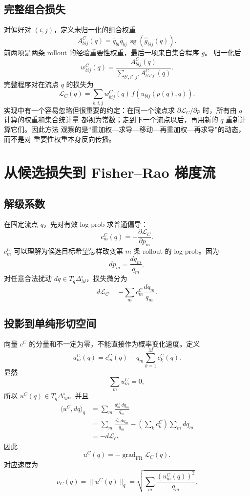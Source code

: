 \documentclass[UTF8,11pt]{ctexart}
\newcommand{\simplex}{\Delta_M^\circ}
\newcommand{\sg}{\operatorname{sg}}
\begin{document}
\subsection{完整组合损失}

对偏好对 \((i,j)\)，定义未归一化的组合权重
\[
    A^C_{bij}(q)
    =
    \bar q_{bi}\bar q_{bj}\,
    \sg\!\left(\widehat g_{bij}(q)\right).
\]
前两项是两条 rollout 的经验重要性权重，最后一项来自集合程序 \(g\)。
归一化后
\[
    w^C_{bij}(q)
    =
    \frac{A^C_{bij}(q)}
    {\sum_{b',i',j'}A^C_{b'i'j'}(q)}.
\]
完整程序对在流点 \(q\) 的损失为
\[
    \mathcal L_C(q)
    =
    \sum_{b,i,j}
    w^C_{bij}(q)\,
    f\!\left(u_{bij}(p(q),q)\right).
    \label{eq:combined-loss}
\]
实现中有一个容易忽略但很重要的约定：在同一个流点求
\(\partial\mathcal L_C/\partial p\) 时，所有由 \(q\) 计算的权重和集合统计量
都视为常数；走到下一个流点以后，再用新的 \(q\) 重新计算它们。因此方法
观察的是“重加权---求导---移动---再重加权---再求导”的动态，而不是对
重要性权重本身反向传播。

\section{从候选损失到 Fisher--Rao 梯度流}

\subsection{解级系数}

在固定流点 \(q\)，先对有效 log-prob 求普通偏导：
\[
    c_m^C(q)
    =
    -\frac{\partial\mathcal L_C}{\partial p_m}.
\]
\(c_m^C\) 可以理解为候选目标希望怎样改变第 \(m\) 条 rollout 的
log-prob。因为
\[
    dp_m=\frac{dq_m}{q_m},
\]
对任意合法扰动 \(dq\in T_q\simplex\)，损失微分为
\[
    d\mathcal L_C
    =
    -\sum_m c_m^C\frac{dq_m}{q_m}.
\]

\subsection{投影到单纯形切空间}

向量 \(c^C\) 的分量和不一定为零，不能直接作为概率变化速度。定义
\[
    u_m^C(q)
    =
    c_m^C(q)
    -
    q_m\sum_{k=1}^{M}c_k^C(q).
    \label{eq:fisher-field}
\]
显然
\[
    \sum_m u_m^C=0,
\]
所以 \(u^C(q)\in T_q\simplex\)。并且
\[
\begin{aligned}
    \langle u^C,dq\rangle_q
    &=
    \sum_m\frac{u_m^C\,dq_m}{q_m}\\
    &=
    \sum_m\frac{c_m^C\,dq_m}{q_m}
    -
    \left(\sum_kc_k^C\right)\sum_mdq_m\\
    &=-d\mathcal L_C.
\end{aligned}
\]
因此
\[
    u^C(q)
    =
    -\operatorname{grad}_{\mathrm{FR}}\mathcal L_C(q).
\]
对应速度为
\[
    \nu_C(q)
    =
    \|u^C(q)\|_q
    =
    \sqrt{
    \sum_m\frac{(u_m^C(q))^2}{q_m}
    }.
\]
\end{document}
